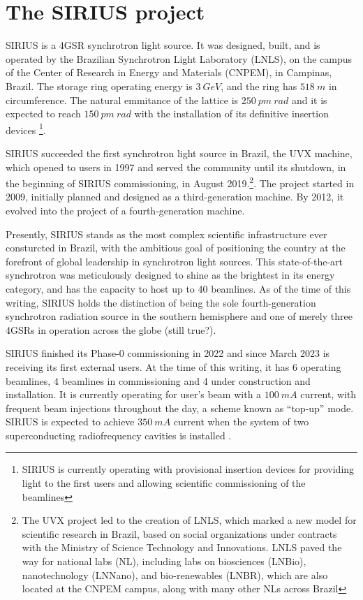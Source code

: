 \section{The SIRIUS project}
SIRIUS is a 4GSR synchrotron light source. It was designed, built, and is operated by the Brazilian Synchrotron Light Laboratory (LNLS), on the campus of the Center of Research in Energy and Materials (CNPEM), in Campinas, Brazil. The storage ring operating energy is $3~\unit{GeV}$, and the ring has $518~\unit{m}$ in circumference. The natural emmitance of the lattice is $250~\unit{pm}~\unit{rad}$ and it is expected to reach $150~\unit{pm}~\unit{rad}$ with the installation of its definitive insertion devices \cite{liu_synchrotron_2019}\footnote{SIRIUS is currently operating with provisional insertion devices for providing light to the first users and allowing scientific commissioning of the beamlines}.

SIRIUS succeeded the first synchrotron light source in Brazil, the UVX machine, which opened to users in 1997 and served the community until its shutdown, in the beginning of SIRIUS commissioning, in August 2019.\footnote{The UVX project led to the creation of LNLS, which marked a new model for scientific research in Brazil, based on social organizations under contracts with the Ministry of Science Technology and Innovations. LNLS paved the way for national labs (NL), including labs on biosciences (LNBio), nanotechnology (LNNano), and bio-renewables (LNBR), which are also located at the CNPEM campus, along with many other NLs across Brazil}\cite{liu_synchrotron_2019}. The project started in 2009, initially planned and designed as a third-generation machine. By 2012, it evolved into the project of a fourth-generation machine\cite{liu_synchrotron_2019}.

Presently, SIRIUS stands as the most complex scientific infrastructure ever consturcted in Brazil, with the ambitious goal of positioning the country at the forefront of global leadership in synchrotron light sources. This state-of-the-art synchrotron was meticulously designed to shine as the brightest in its energy category, and has the capacity to host up to 40 beamlines. As of the time of this writing, SIRIUS holds the distinction of being the sole fourth-generation synchrotron radiation source in the southern hemisphere and one of merely three 4GSRs in operation across the globe (still true?).

SIRIUS finished its Phase-0 commissioning in 2022 and since March 2023 is receiving its first external users. At the time of this writing, it has 6 operating beamlines, 4 beamlines in commissioning and 4 under construction and installation. It is currently operating for user's beam with a $100~\unit{mA}$ current, with frequent beam injections throughout the day, a scheme known as ``top-up'' mode. SIRIUS is expected to achieve $350~\unit{mA}$ current when the system of two superconducting radiofrequency cavities is installed \cite{liu_status_2022,liu_status_2023}.
